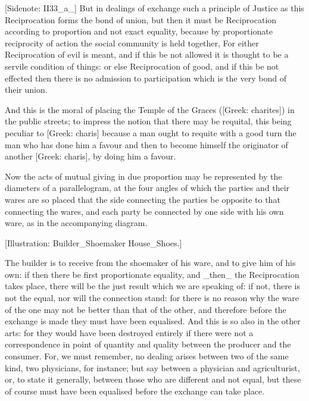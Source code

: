 [Sidenote: II33_a_] But in dealings of exchange such a principle of
Justice as this Reciprocation forms the bond of union, but then it must
be Reciprocation according to proportion and not exact equality, because
by proportionate reciprocity of action the social community is held
together, For either Reciprocation of evil is meant, and if this be
not allowed it is thought to be a servile condition of things: or else
Reciprocation of good, and if this be not effected then there is no
admission to participation which is the very bond of their union.

And this is the moral of placing the Temple of the Graces ([Greek:
charites]) in the public streets; to impress the notion that there may
be requital, this being peculiar to [Greek: charis] because a man ought
to requite with a good turn the man who has done him a favour and then
to become himself the originator of another [Greek: charis], by doing
him a favour.

Now the acts of mutual giving in due proportion may be represented
by the diameters of a parallelogram, at the four angles of which the
parties and their wares are so placed that the side connecting the
parties be opposite to that connecting the wares, and each party be
connected by one side with his own ware, as in the accompanying diagram.

[Illustration: Builder_Shoemaker House_Shoes.]

The builder is to receive from the shoemaker of his ware, and to give
him of his own: if then there be first proportionate equality, and
_then_ the Reciprocation takes place, there will be the just result
which we are speaking of: if not, there is not the equal, nor will the
connection stand: for there is no reason why the ware of the one may not
be better than that of the other, and therefore before the exchange is
made they must have been equalised. And this is so also in the other
arts: for they would have been destroyed entirely if there were not a
correspondence in point of quantity and quality between the producer and
the consumer. For, we must remember, no dealing arises between two of
the same kind, two physicians, for instance; but say between a physician
and agriculturist, or, to state it generally, between those who are
different and not equal, but these of course must have been equalised
before the exchange can take place.

